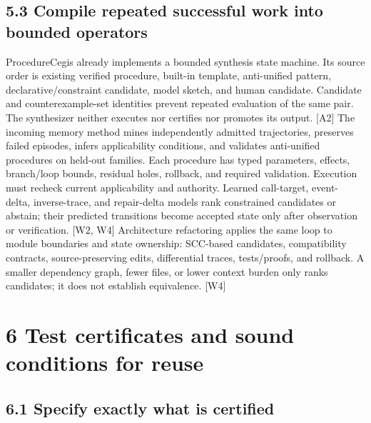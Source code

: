 \subsection*{5.3 Compile repeated successful work into bounded operators}

ProcedureCegis already implements a bounded synthesis state machine. Its source order is existing
verified procedure, built-in template, anti-unified pattern, declarative/constraint candidate, model
sketch, and human candidate. Candidate and counterexample-set identities prevent repeated evaluation
of the same pair. The synthesizer neither executes nor certifies nor promotes its output. [A2]
The incoming memory method mines independently admitted trajectories, preserves failed episodes,
infers applicability conditions, and validates anti-unified procedures on held-out families. Each
procedure has typed parameters, effects, branch/loop bounds, residual holes, rollback, and required
validation. Execution must recheck current applicability and authority. Learned call-target, event-
delta, inverse-trace, and repair-delta models rank constrained candidates or abstain; their predicted
transitions become accepted state only after observation or verification. [W2, W4]
Architecture refactoring applies the same loop to module boundaries and state ownership: SCC-based
candidates, compatibility contracts, source-preserving edits, differential traces, tests/proofs, and
rollback. A smaller dependency graph, fewer files, or lower context burden only ranks candidates; it
does not establish equivalence. [W4]


\section*{6 Test certificates and sound conditions for reuse}

\subsection*{6.1 Specify exactly what is certified}

